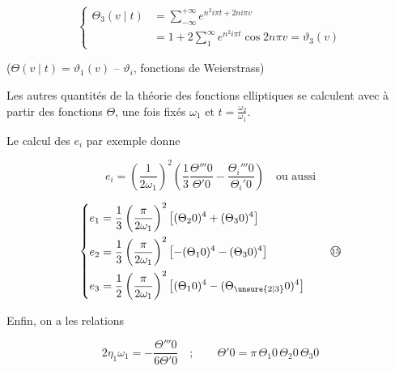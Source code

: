 \[
\left\{\begin{aligned}
\Theta_3(v\mid t)&=\sum_{-\infty}^{+\infty}e^{n^2i\pi t+2ni\pi v}\\
&=1+2\sum_1^\infty e^{n^2i\pi t}\cos2n\pi v=\vartheta_3(v)
\end{aligned}\right.
\]

($\Theta(v\mid t)=\vartheta_1(v)$ \quad -- $\vartheta_i$, fonctions de Weierstrass)

Les autres quantités de la théorie des fonctions elliptiques se calculent avec  à partir des fonctions $\Theta$, une fois fixés $\omega_1$ et $t=\frac{\omega_2}{\omega_1}$.

Le calcul des $e_i$ par exemple donne

\[
e_i=\left(\frac1{2\omega_1}\right)^2
\left(\frac13\frac{\Theta'''0}{\Theta'0}-\frac{\Theta_i'''0}{\Theta_i'0}\right)
\quad\text{ou aussi}
\]

\[
\left\{\begin{aligned}
e_1&=\frac13\left(\frac{\pi}{2\omega_1}\right)^2\left[(\Theta_2 0)^4+(\Theta_3 0)^4\right]\\
e_2&=\frac13\left(\frac{\pi}{2\omega_1}\right)^2\left[-(\Theta_1 0)^4-(\Theta_3 0)^4\right]\\
e_3&=\frac12\left(\frac{\pi}{2\omega_1}\right)^2\left[(\Theta_1 0)^4-(\Theta_{\unsure{2|3}}0)^4\right]
\end{aligned}\right.
\tag*{\textcircled{\scriptsize 15}}
\]

Enfin, on a les relations

\[
2\eta_1\omega_1=-\frac{\Theta'''0}{6\Theta'0}\quad;\qquad
\Theta'0=\pi\,\Theta_1 0\,\Theta_2 0\,\Theta_3 0
\]

